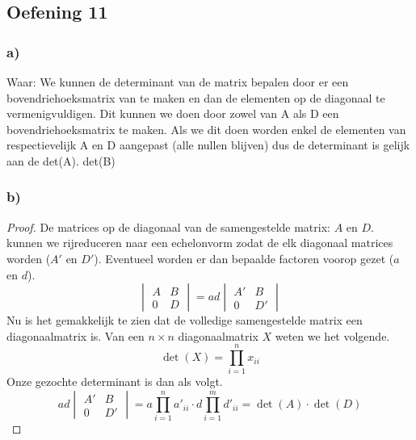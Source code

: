 \documentclass[lineaire_algebra_oplossingen.tex]{subfiles}
\begin{document}
\subsection{Oefening 11}
\subsubsection*{a)}
Waar: We kunnen de determinant van de matrix bepalen door er een bovendriehoeksmatrix van te maken en dan de elementen op de diagonaal te vermenigvuldigen. Dit kunnen we doen door zowel van A als D een bovendriehoeksmatrix te maken. Als we dit doen worden enkel de elementen van respectievelijk A en D aangepast (alle nullen blijven) dus de determinant is gelijk aan de det(A). det(B)

\subsubsection*{b)}
\begin{proof}
De matrices op de diagonaal van de samengestelde matrix: $A$ en $D$. kunnen we rijreduceren naar een echelonvorm zodat de elk diagonaal matrices worden ($A'$ en $D'$). Eventueel worden er dan bepaalde factoren voorop gezet ($a$ en $d$).
\[
\begin{vmatrix}
A & B\\
0 & D
\end{vmatrix}
=
ad
\begin{vmatrix}
A' & B\\
0 & D'
\end{vmatrix}
\]
Nu is het gemakkelijk te zien dat de volledige samengestelde matrix een diagonaalmatrix is.
Van een $n\times n$ diagonaalmatrix $X$ weten we het volgende.
\[
\det \left({X}\right) = \prod_{i \mathop = 1}^n x_{ii}
\]
Onze gezochte determinant is dan als volgt.
\[
ad
\begin{vmatrix}
A' & B\\
0 & D'
\end{vmatrix} = a\prod_{i \mathop = 1}^n a'_{ii} \cdot d \prod_{i \mathop = 1}^m d'_{ii} = \det \left({A}\right)\cdot\det \left({D}\right)
\]
\end{proof}
\end{document}
